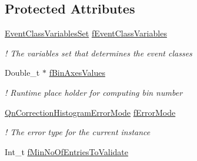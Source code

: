 \subsection*{Protected Attributes}
\begin{DoxyCompactItemize}
\item 
\mbox{\label{classQn_1_1CorrectionHistogramBase_a200e54a03fbc9a3ec94859da7435f1bf}} 
\mbox{\hyperlink{classQn_1_1EventClassVariablesSet}{Event\+Class\+Variables\+Set}} \mbox{\hyperlink{classQn_1_1CorrectionHistogramBase_a200e54a03fbc9a3ec94859da7435f1bf}{f\+Event\+Class\+Variables}}
\begin{DoxyCompactList}\small\item\em ! The variables set that determines the event classes \end{DoxyCompactList}\item 
\mbox{\label{classQn_1_1CorrectionHistogramBase_a163c240f08d4379aebd45f49f5a7e49a}} 
Double\+\_\+t $\ast$ \mbox{\hyperlink{classQn_1_1CorrectionHistogramBase_a163c240f08d4379aebd45f49f5a7e49a}{f\+Bin\+Axes\+Values}}
\begin{DoxyCompactList}\small\item\em ! Runtime place holder for computing bin number \end{DoxyCompactList}\item 
\mbox{\label{classQn_1_1CorrectionHistogramBase_a2db7ea40c7f078cd4ad9b5fac854ce84}} 
\mbox{\hyperlink{classQn_1_1CorrectionHistogramBase_ab32a60a9143c64f214ab3a2ed9263dfc}{Qn\+Correction\+Histogram\+Error\+Mode}} \mbox{\hyperlink{classQn_1_1CorrectionHistogramBase_a2db7ea40c7f078cd4ad9b5fac854ce84}{f\+Error\+Mode}}
\begin{DoxyCompactList}\small\item\em ! The error type for the current instance \end{DoxyCompactList}\item 
Int\+\_\+t \mbox{\hyperlink{classQn_1_1CorrectionHistogramBase_a3a377eb100c6b5dc6c1c0c1f35f071b7}{f\+Min\+No\+Of\+Entries\+To\+Validate}}
\end{DoxyCompactItemize}
